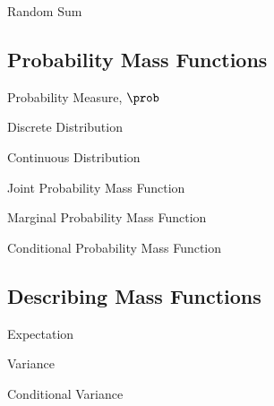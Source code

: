 \documentclass[11pt,a4paper]{article}
\begin{document}
\begin{definition}{Random Sum}

\end{definition}

\subsection{Probability Mass Functions}

\begin{definition}{Probability Measure, $\prob$}

\end{definition}

\begin{definition}{Discrete Distribution}

\end{definition}

\begin{definition}{Continuous Distribution}
\end{definition}

\begin{definition}{Joint Probability Mass Function}

\end{definition}

\begin{definition}{Marginal Probability Mass Function}

\end{definition}

\begin{definition}{Conditional Probability Mass Function}

\end{definition}

\subsection{Describing Mass Functions}

\begin{definition}{Expectation}

\end{definition}

\begin{definition}{Variance}

\end{definition}

\begin{definition}{Conditional Variance}

\end{definition}
\end{document}

